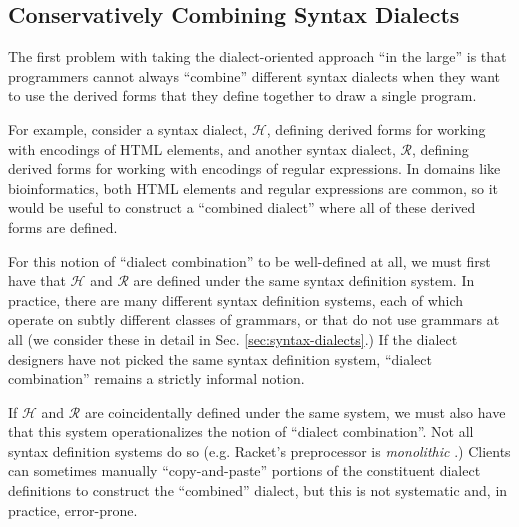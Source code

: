 \subsection{Conservatively Combining Syntax Dialects}
The first problem with taking the dialect-oriented approach ``in the large'' is that programmers cannot always ``combine'' different syntax dialects when they want to use the derived forms that they define together to draw a single program.

For example, consider a syntax dialect, $\mathcal{H}$, defining derived forms for working with encodings of HTML elements, and another syntax dialect, $\mathcal{R}$,  defining derived forms for working with encodings of regular expressions. In domains like bioinformatics, both HTML elements and regular expressions are common, so it would be useful to construct a ``combined dialect'' where all of these derived forms are defined. 

For this notion of ``dialect combination'' to be well-defined at all, we must first have that $\mathcal{H}$ and $\mathcal{R}$ are defined under the same syntax definition system. In practice, there are many different syntax definition systems, each of which operate on subtly different classes of grammars, or that do not use grammars at all (we consider these in detail in Sec. \ref{sec:syntax-dialects}.) If the dialect designers  have not  picked the same syntax definition system, ``dialect combination'' remains a strictly informal notion.%

If $\mathcal{H}$ and $\mathcal{R}$ are coincidentally defined under the same system, we must also have that this system operationalizes the notion of ``dialect combination''. Not all syntax definition systems do so (e.g. Racket's preprocessor is \emph{monolithic} \cite{Flatt:2012:CLR:2063176.2063195}.) Clients can sometimes manually  ``copy-and-paste'' portions of the constituent dialect definitions to construct the ``combined'' dialect, but this is not systematic and, in practice, error-prone.%

